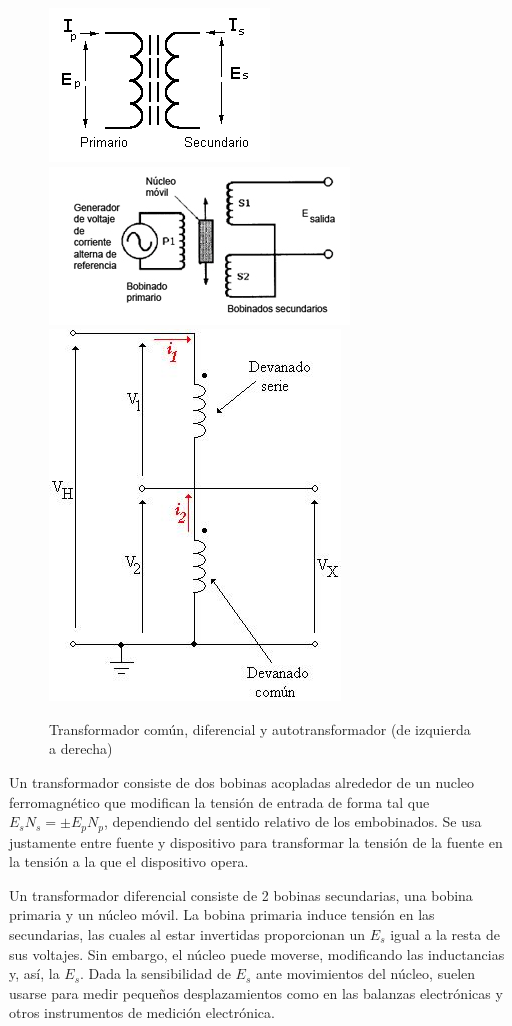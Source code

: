 \documentclass[a4paper,10pt,fleqn,oneside]{article}
\begin{document}
\begin{enumerate}[1.]
	\begin{figure}[h]
		\centering
		\includegraphics[scale=0.6]{Trans.png}
		\includegraphics[scale=0.6]{TransDif.jpg}
		\includegraphics[scale=0.45]{AutoTrans.jpg}
		\caption{Transformador común, diferencial y autotransformador (de izquierda a derecha)}
		\label{CH}
	\end{figure}
	
	Un transformador consiste de dos bobinas acopladas alrededor de un nucleo ferromagnético que modifican la tensión de entrada de forma tal que $E_s N_s = \pm E_pN_p$, dependiendo del sentido relativo de los embobinados. Se usa justamente entre fuente y dispositivo para transformar la tensión de la fuente en la tensión a la que el dispositivo opera.
	
	Un transformador diferencial consiste de 2 bobinas secundarias, una bobina primaria y un núcleo móvil. La bobina primaria induce tensión en las secundarias, las cuales al estar invertidas proporcionan un $E_s$ igual a la resta de sus voltajes. Sin embargo, el núcleo puede moverse, modificando las inductancias y, así, la $E_s$. Dada la sensibilidad de $E_s$ ante movimientos del núcleo, suelen usarse para medir pequeños desplazamientos como en las balanzas electrónicas y otros instrumentos de medición electrónica.
	

\end{enumerate}
\end{document}

